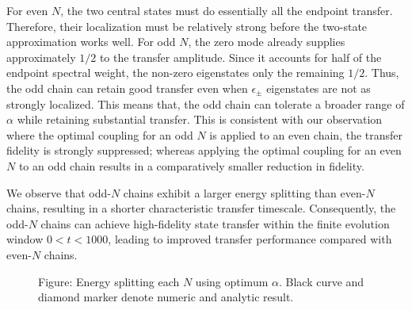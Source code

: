 \documentclass[../../../main.tex]{subfiles}
\begin{document}
For even \(N\), the two central states must do essentially all the endpoint transfer.
Therefore, their localization must be relatively strong before the two-state approximation works well.
For odd \(N\), the zero mode already supplies approximately $1/2$ to the transfer amplitude.
Since it accounts for half of the endpoint spectral weight, the non-zero eigenstates only the remaining $1/2$.
Thus, the odd chain can retain good transfer even when \(\epsilon_\pm\) eigenstates are not as strongly localized.
This means that, the odd chain can tolerate a broader range of \(\alpha\) while retaining substantial transfer.
This is consistent with our observation where the optimal coupling for an odd $N$ is applied to an even chain, the transfer fidelity is strongly suppressed; whereas applying the optimal coupling for an even $N$ to an odd chain results in a comparatively smaller reduction in fidelity.


We observe that odd-\(N\) chains exhibit a larger energy splitting than even-\(N\) chains, resulting in a shorter characteristic transfer timescale.
Consequently, the odd-\(N\) chains can achieve high-fidelity state transfer within the finite evolution window \(0<t<1000\), leading to improved transfer performance compared with even-\(N\) chains.

\begin{figure}
  \centering
  \caption*{Figure: Energy splitting each $N$ using optimum $\alpha$. Black curve and diamond marker denote numeric and analytic result.}
\end{figure}
\end{document}
